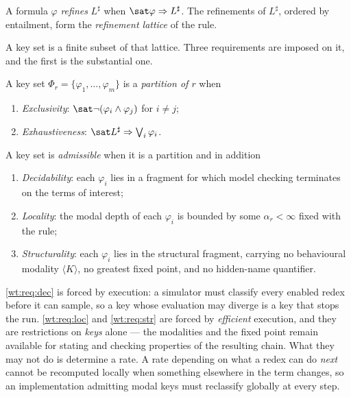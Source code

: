 \begin{definition}[Refinement]
\label{wt:def:refinement}
A formula $\varphi$ \emph{refines} $L^{\sharp}$ when $\sat \varphi \Rightarrow L^{\sharp}$.
The refinements of $L^{\sharp}$, ordered by entailment, form the \emph{refinement lattice}
of the rule.
\end{definition}

A key set is a finite subset of that lattice. Three requirements are imposed on it, and
the first is the substantial one.

\begin{definition}
\label{wt:def:partition}
A key set $\Phi_r = \{\varphi_1, \ldots, \varphi_m\}$ is a \emph{partition of $r$} when
\begin{enumerate}[label=(P\arabic*),leftmargin=3em]
  \item \emph{Exclusivity}: $\sat \neg(\varphi_i \wedge \varphi_j)$ for $i \neq j$;
  \item \emph{Exhaustiveness}: $\sat L^{\sharp} \Rightarrow \bigvee_i \varphi_i$.
\end{enumerate}
\end{definition}

\begin{definition}
\label{wt:def:reqs}
A key set is \emph{admissible} when it is a partition and in addition
\begin{enumerate}[label=(R\arabic*),leftmargin=3em]
  \item\label{wt:req:dec} \emph{Decidability}: each $\varphi_i$ lies in a fragment for
        which model checking terminates on the terms of interest;
  \item\label{wt:req:loc} \emph{Locality}: the modal depth of each $\varphi_i$ is bounded
        by some $\alpha_r < \infty$ fixed with the rule;
  \item\label{wt:req:str} \emph{Structurality}: each $\varphi_i$ lies in the structural
        fragment, carrying no behavioural modality $\langle K \rangle$, no greatest fixed
        point, and no hidden-name quantifier.
\end{enumerate}
\end{definition}

\ref{wt:req:dec} is forced by execution: a simulator must classify every enabled redex
before it can sample, so a key whose evaluation may diverge is a key that stops the run.
\ref{wt:req:loc} and \ref{wt:req:str} are forced by \emph{efficient} execution, and they
are restrictions on \emph{keys} alone --- the modalities and the fixed point remain
available for stating and checking properties of the resulting chain. What they may not
do is determine a rate. A rate depending on what a redex can do \emph{next} cannot be
recomputed locally when something elsewhere in the term changes, so an implementation
admitting modal keys must reclassify globally at every step.


